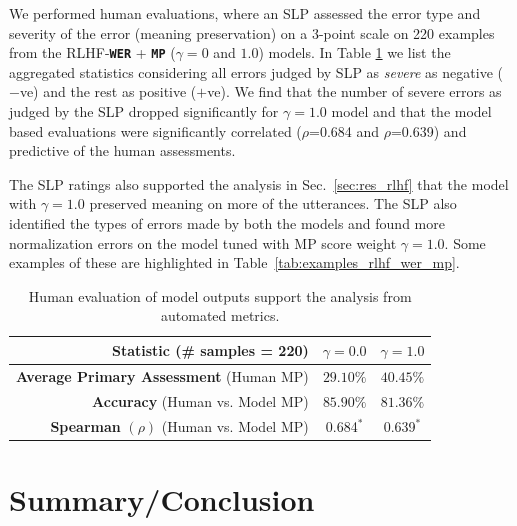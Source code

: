 \documentclass[conference]{IEEEtran}
\begin{document}
We performed human evaluations, where an SLP assessed the error type and severity of the error (meaning preservation) on a 3-point\footnotemark{}%
scale on 220 examples from the RLHF-\texttt{\textbf{WER}} + \texttt{\textbf{MP}} ($\gamma=0$ and $1.0$) models. 
In Table \ref{tab:human_eval} we list the aggregated statistics considering all errors judged by SLP as \textit{severe} as negative ($-$ve) and the rest as positive ($+$ve). We find that the number of severe errors as judged by the SLP dropped significantly for $\gamma=1.0$ model and that the model based evaluations were significantly correlated ($\rho$=0.684 and $\rho$=0.639) and predictive of the human assessments. 


The SLP ratings also supported the analysis in Sec.~\ref{sec:res_rlhf} that the model with $\gamma=1.0$ preserved meaning on more of the utterances. The SLP also identified the types of errors made by both the models and found more normalization errors on the model tuned with MP score weight $\gamma=1.0$. Some examples of these are highlighted in Table~\ref{tab:examples_rlhf_wer_mp}.  %

%
%
%
%
%

\begin{table}[!t]
    \centering
    \caption{Human evaluation of model outputs support the analysis from automated metrics.}
    \vspace{-0.6em}
    \begin{tabular}{r|c|c}
    \toprule \midrule
         \textbf{Statistic} (\# samples = 220)& $\gamma=0.0$ & $\gamma=1.0$ \\ \midrule
         \textbf{Average Primary Assessment} (Human MP) & $29.10\%$ & $40.45\%$  \\
         \textbf{Accuracy} (Human vs. Model MP) & $85.90\%$ & $81.36\%$  \\
         \textbf{Spearman} $(\rho)$ (Human vs. Model MP)  & 0.684$^*$ & 0.639$^*$  \\

         \bottomrule
    \end{tabular}
    \label{tab:human_eval}
\end{table}


\section{Summary/Conclusion}
\end{document}

